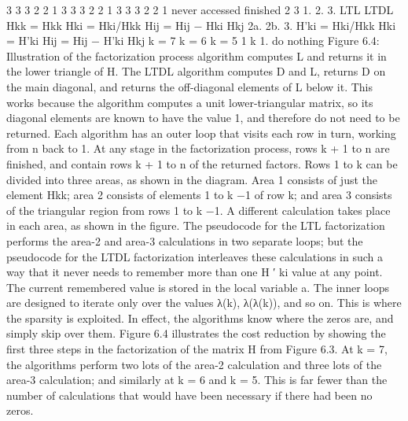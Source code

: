 3 3 3 2 2 1 3 3 3 2 2 1 3 3 3 2 2 1 never accessed finished 2 3 1. 2. 3. LTL LTDL Hkk = Hkk Hki = Hki/Hkk Hij = Hij − Hki Hkj 2a. 2b. 3. H’ki = Hki/Hkk Hki = H’ki Hij = Hij − H’ki Hkj k = 7 k = 6 k = 5 1 k 1. do nothing Figure 6.4: Illustration of the factorization process algorithm computes L and returns it in the lower triangle of H. The LTDL algorithm computes D and L, returns D on the main diagonal, and returns the off-diagonal elements of L below it. This works because the algorithm computes a unit lower-triangular matrix, so its diagonal elements are known to have the value 1, and therefore do not need to be returned. Each algorithm has an outer loop that visits each row in turn, working from n back to 1. At any stage in the factorization process, rows k + 1 to n are finished, and contain rows k + 1 to n of the returned factors. Rows 1 to k can be divided into three areas, as shown in the diagram. Area 1 consists of just the element Hkk; area 2 consists of elements 1 to k −1 of row k; and area 3 consists of the triangular region from rows 1 to k −1. A different calculation takes place in each area, as shown in the figure. The pseudocode for the LTL factorization performs the area-2 and area-3 calculations in two separate loops; but the pseudocode for the LTDL factorization interleaves these calculations in such a way that it never needs to remember more than one H ′ ki value at any point. The current remembered value is stored in the local variable a. The inner loops are designed to iterate only over the values λ(k), λ(λ(k)), and so on. This is where the sparsity is exploited. In effect, the algorithms know where the zeros are, and simply skip over them. Figure 6.4 illustrates the cost reduction by showing the first three steps in the factorization of the matrix H from Figure 6.3. At k = 7, the algorithms perform two lots of the area-2 calculation and three lots of the area-3 calculation; and similarly at k = 6 and k = 5. This is far fewer than the number of calculations that would have been necessary if there had been no zeros.

